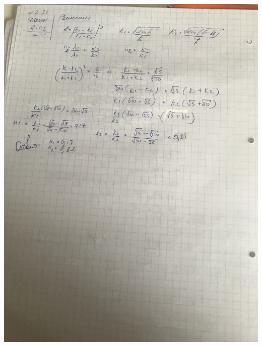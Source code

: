 \documentclass[12pt]{article}
\begin{document}
\begin{center}
\includegraphics[scale=0.18]{3_2.jpeg}\\
\end{center}
\end{document}
